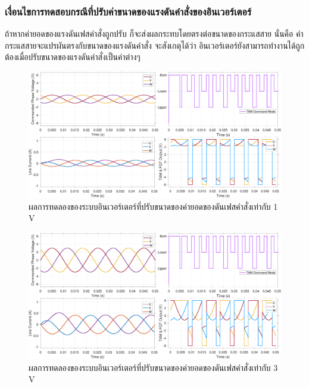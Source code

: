 \documentclass[11pt,a4paper]{article}
\begin{document}
\subsubsection{เงื่อนไขการทดสอบกรณีที่ปรับค่าขนาดของแรงดันคำสั่งของอินเวอร์เตอร์}

ถ้าหากค่ายอดของแรงดันเฟสคำสั่งถูกปรับ ก็จะส่งผลกระทบโดยตรงต่อขนาดของกระแสสาย นั่นคือ ค่ากระแสสายจะแปรผันตรงกับขนาดของแรงดันคำสั่ง จะสังเกตุได้ว่า อินเวอร์เตอร์ยังสามารถทำงานได้ถูกต้องเมื่อปรับขนาดของแรงดันคำสั่งเป็นค่าต่างๆ

\begin{figure}[H]
    \centering
    \includegraphics[width=\textwidth]{1V.pdf}
    \caption{ผลการทดลองของระบบอินเวอร์เตอร์ที่ปรับขนาดของค่ายอดของดันเฟสคำสั่งเท่ากับ 1 V}
    \label{1V}
\end{figure}

\begin{figure}[H]
    \centering
    \includegraphics[width=\textwidth]{3V.pdf}
    \caption{ผลการทดลองของระบบอินเวอร์เตอร์ที่ปรับขนาดของค่ายอดของดันเฟสคำสั่งเท่ากับ 3 V}
    \label{3V}
\end{figure}
\end{document}
